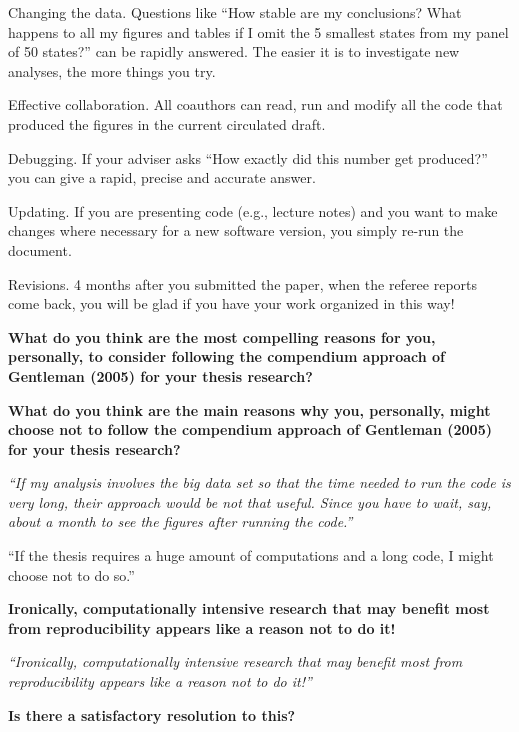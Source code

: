 \documentclass[portrait,11pt]{seminar}
\begin{document}
\bs
\begin{myitemize}
\item Changing the data. Questions like ``How stable are my conclusions? What happens to all my figures and tables if I omit the 5 smallest states from my panel of 50 states?'' can be rapidly answered. The easier it is to investigate new analyses, the more things you try. 
\item Effective collaboration. All coauthors can read, run and modify all the code that produced the figures in the current circulated draft.
\item Debugging. If your adviser asks ``How exactly did this number get produced?'' you can give a rapid, precise and accurate answer.
\item Updating. If you are presenting code (e.g., lecture notes) and you want to make changes where necessary for a new software version, you simply re-run the document.
\item Revisions. 4 months after you submitted the paper, when the referee reports come back, you will be glad if you have your work organized in this way!
\end{myitemize}
\es

\bs
{\bf What do you think are the most compelling reasons for you, personally, to consider following the compendium approach of Gentleman (2005) for your thesis research?}

\it

\es

\bs
{\bf What do you think are the main reasons why you, personally, might choose not to follow the compendium approach of Gentleman (2005) for your thesis research?}

\it ``If my analysis involves the big data set so that the time needed to run the code is very long, their approach would be not that useful. Since you have to wait, say, about a month to see the figures after running the code.''


 ``If the thesis requires a huge amount of computations and a long code, I might choose not to do so.''

{\bf Ironically, computationally intensive research that may benefit most from reproducibility appears like a reason not to do it!}

\es

\bs
{\it ``Ironically, computationally intensive research that may benefit most from reproducibility appears like a reason not to do it!''}

{\bf Is there a satisfactory resolution to this?}
\end{document}
